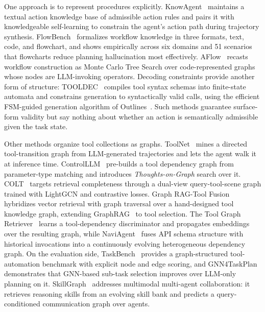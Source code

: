 One approach is to represent procedures explicitly. KnowAgent~\citep{zhu2025knowagent} maintains a textual action knowledge base of admissible action rules and pairs it with knowledgeable self-learning to constrain the agent's action path during trajectory synthesis. FlowBench~\citep{xiao2024flowbench} formalizes workflow knowledge in three formats, text, code, and flowchart, and shows empirically across six domains and 51 scenarios that flowcharts reduce planning hallucination most effectively. AFlow~\citep{zhang2025aflow} recasts workflow construction as Monte Carlo Tree Search over code-represented graphs whose nodes are LLM-invoking operators. Decoding constraints provide another form of structure: TOOLDEC~\citep{zhang2023don} compiles tool syntax schemas into finite-state automata and constrains generation to syntactically valid calls, using the efficient FSM-guided generation algorithm of Outlines~\citep{willard2023efficient}. Such methods guarantee surface-form validity but say nothing about whether an action is semantically admissible given the task state.

Other methods organize tool collections as graphs. ToolNet~\citep{liu2024toolnet} mines a directed tool-transition graph from LLM-generated trajectories and lets the agent walk it at inference time. ControlLLM~\citep{liu2024controlllm} pre-builds a tool dependency graph from parameter-type matching and introduces \emph{Thoughts-on-Graph} search over it. COLT~\citep{qu2024towards} targets retrieval completeness through a dual-view query-tool-scene graph trained with LightGCN and contrastive losses. Graph RAG-Tool Fusion~\citep{lumer2025graph} hybridizes vector retrieval with graph traversal over a hand-designed tool knowledge graph, extending GraphRAG~\citep{edge2024local} to tool selection. The Tool Graph Retriever~\citep{gao2025tool} learns a tool-dependency discriminator and propagates embeddings over the resulting graph, while NaviAgent~\citep{jiang2025naviagent} fuses API schema structure with historical invocations into a continuously evolving heterogeneous dependency graph. On the evaluation side, TaskBench~\citep{shen2024taskbench} provides a graph-structured tool-automation benchmark with explicit node and edge scoring, and GNN4TaskPlan~\citep{wu2024can} demonstrates that GNN-based sub-task selection improves over LLM-only planning on it. SkillGraph~\citep{nie2026skillgraph} addresses multimodal multi-agent collaboration: it retrieves reasoning skills from an evolving skill bank and predicts a query-conditioned communication graph over agents.

